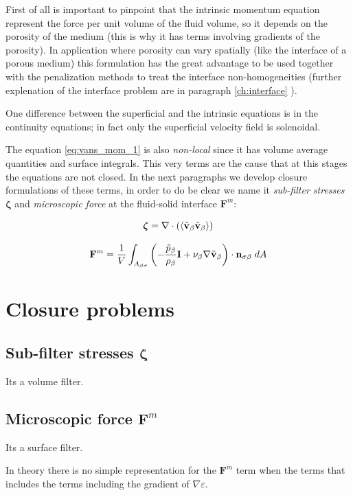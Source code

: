 First of all is important to pinpoint that the intrinsic momentum equation represent the force per unit volume of the fluid volume, so it depends on the porosity of the medium (this is why it has terms involving gradients of the porosity).
In application where porosity can vary spatially (like the interface of a porous medium) this formulation has the great advantage to be used together with the penalization methods to treat the interface non-homogeneities (further explenation of the interface problem are in paragraph \ref{ch:interface}  ).

One difference between the superficial and the intrinsic equations is in the continuity equations; in fact only the superficial velocity field is solenoidal.

The equation \eqref{eq:vans_mom_1} is also \textit{non-local} since it has volume average quantities and surface integrals.
This very terms are the cause that at this stages the equations are not closed.
In the next paragraphs we develop closure formulations of these terms, in order to do be clear we name it \textit{sub-filter stresses} $\boldsymbol{\zeta}$ and \textit{microscopic force} at the fluid-solid interface $\mathbf{F}^m$:

$$
\boldsymbol{\zeta} = \nabla \cdot \left({\left< \tilde{\textbf{v}}_{\beta} \tilde{\textbf{v}}_{\beta} \right>}\right)
$$

$$
\mathbf{F}^m =  \dfrac{1}{V} \int_{A_{\beta \sigma}} \left(-\dfrac{\tilde{p}_{\beta}}{\rho_{\beta}} \mathbf{I}  + \nu_{\beta} \nabla \tilde{\textbf{v}}_{\beta} \right)\cdot \mathbf{n}_{\sigma \beta} \;dA
$$



\section{Closure problems}



\subsection{Sub-filter stresses $\boldsymbol{\zeta}$}

Its a volume filter.

\subsection{Microscopic force $\mathbf{F}^m$}
Its a surface filter.

In theory there is no simple representation for the $\mathbf{F}^m$ term when the terms that includes the terms including the gradient of $\nabla \varepsilon$.

